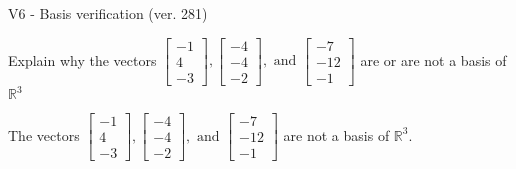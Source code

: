 \begin{exercise}
  \begin{exerciseTitle}V6 - Basis verification (ver. 281)\end{exerciseTitle}
  \begin{exerciseStatement}
    Explain why the vectors \(\left[\begin{array}{r}
-1 \\
4 \\
-3
\end{array}\right] , \left[\begin{array}{r}
-4 \\
-4 \\
-2
\end{array}\right] , \text{ and } \left[\begin{array}{r}
-7 \\
-12 \\
-1
\end{array}\right]\) are or are not a basis of \(\mathbb{R}^3\)	


  \end{exerciseStatement}
  \begin{exerciseAnswer}
   The vectors \(\left[\begin{array}{r}
-1 \\
4 \\
-3
\end{array}\right] , \left[\begin{array}{r}
-4 \\
-4 \\
-2
\end{array}\right] , \text{ and } \left[\begin{array}{r}
-7 \\
-12 \\
-1
\end{array}\right]\) 
  	 are not  a basis of \(\mathbb{R}^3\).
  


  \end{exerciseAnswer}
\end{exercise}